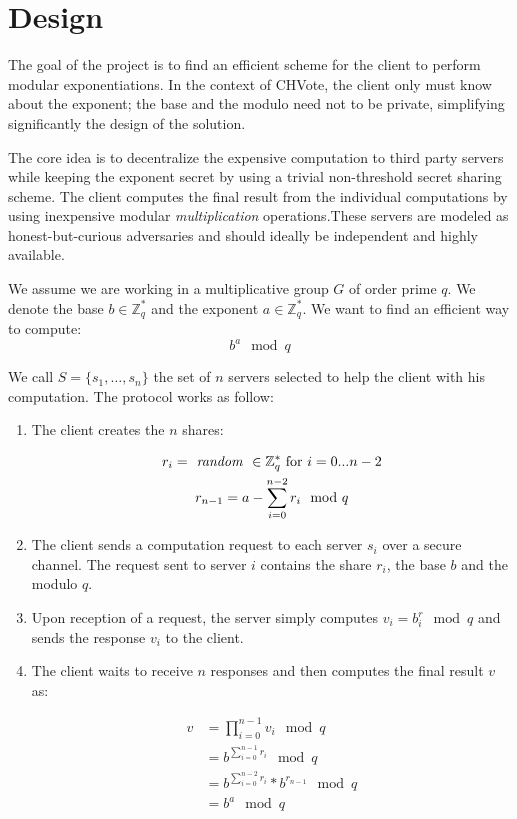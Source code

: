 \documentclass[]{article}
\newcommand{\ZZ}{\ensuremath{\mathbb{Z}}}
\begin{document}
\section{Design} \label{design}

The goal of the project is to find an efficient scheme for the client to perform
modular exponentiations. In the context of CHVote, the client only must know
about the exponent; the base and the modulo need not to be private, simplifying
significantly the design of the solution.

The core idea is to decentralize the expensive computation to third party
servers while keeping the exponent secret by using a trivial non-threshold
secret sharing scheme. The client computes the final result from the individual
computations by using inexpensive modular \textit{multiplication}
operations.These servers are modeled as honest-but-curious adversaries and
should ideally be independent and highly available.


We assume we are working in a multiplicative group $G$ of order prime $q$. We denote
the base $b \in \ZZ_q^*$ and the exponent $a \in \ZZ_q^*$. We want to find an
efficient way to compute: $$ b^a \mod q $$

We call $S = \{s_1,\dots,s_n\}$ the set of $n$ servers selected to help
the client with his computation. The protocol works as follow:

\begin{enumerate}

    \item The client creates the $n$ shares:

        \begin{gather}
            \nonumber r_i = \text{\textit{ random }} \in \ZZ_q^* \text{  for } i=0...n-2\\
            \nonumber r_{n-1} = {a - \sum_{i=0}^{n-2} r_i} \mod q
        \end{gather}

    \item The client sends a computation request to each server $s_i$ over a
        secure channel. The request sent to server $i$ contains the share $r_i$,
        the base $b$ and the modulo $q$.

    \item Upon reception of a request, the server simply computes $ v_i = b^r_i
        \mod q$ and sends the response $v_i$ to the client.

    \item The client waits to receive $n$ responses and then computes the final
        result $v$ as: 

        \begin{align}
          \nonumber v &= \prod_{i=0}^{n-1} {v_i \mod q}\\
          \nonumber   &= b^{\sum_{i=0}^{n-1} r_i} \mod q\\
          \nonumber   &= b^{\sum_{i=0}^{n-2} r_i} * b^{r_{n-1}} \mod q\\
          \nonumber   &= b^a \mod q
        \end{align}

\end{enumerate}
\end{document}
